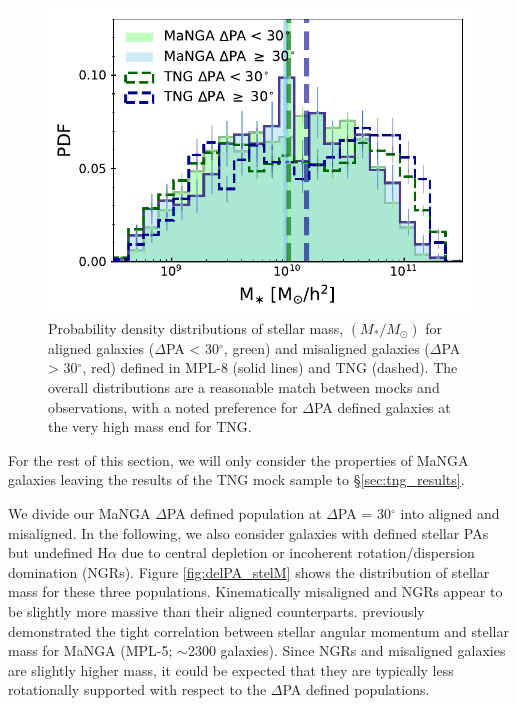 \documentclass[fleqn,usenatbib]{mnras}
\begin{document}
\begin{figure}
	\includegraphics[width=\linewidth]{tng_appendix/delPA_split_stelM_tng_comparison.pdf}
    \caption{Probability density distributions of stellar mass, $(M_{\ast}/M_{\odot})$ for aligned galaxies ($\Delta$PA < 30$^{\circ}$, green) and misaligned galaxies ($\Delta$PA > 30$^{\circ}$, red) defined in MPL-8 (solid lines) and TNG (dashed). The overall distributions are a reasonable match between mocks and observations, with a noted preference for $\Delta$PA defined galaxies at the very high mass end for TNG.}
    \label{fig:TNG_mpl8_stelM}
\end{figure}

For the rest of this section, we will only consider the properties of MaNGA galaxies leaving the results of the TNG mock sample to \S\ref{sec:tng_results}.

We divide our MaNGA $\Delta$PA defined population at $\Delta$PA = 30$^{\circ}$ into aligned and misaligned. In the following, we also consider galaxies with defined stellar PAs but undefined H$\alpha$ due to central depletion or incoherent rotation/dispersion domination (NGRs). Figure \ref{fig:delPA_stelM} shows the distribution of stellar mass for these three populations. Kinematically misaligned and NGRs appear to be slightly more massive than their aligned counterparts.
\citet{graham2018} previously demonstrated the tight correlation between stellar angular momentum and stellar mass for MaNGA (MPL-5; $\sim$2300 galaxies). Since NGRs and misaligned galaxies are slightly higher mass, it could be expected that they are typically less rotationally supported with respect to the $\Delta$PA defined populations. 
\end{document}

